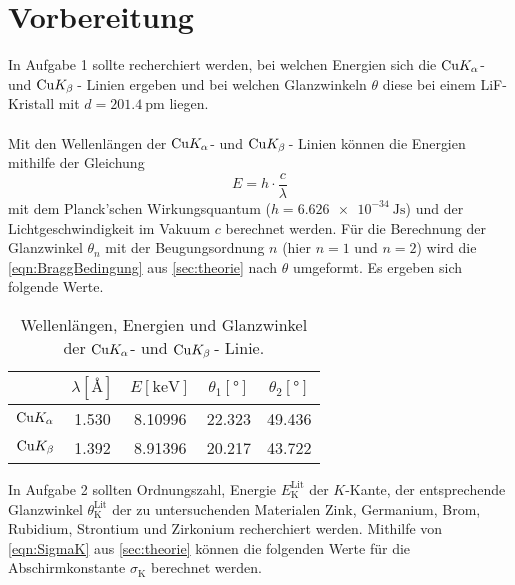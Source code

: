 \section{Vorbereitung}
\label{sec:vorbereitung}

    In Aufgabe 1 sollte recherchiert werden,
    bei welchen Energien sich die $\ce{Cu} K_\alpha$- und $\ce{Cu} K_\beta \,$- Linien ergeben
    und bei welchen Glanzwinkeln $\theta$ diese bei einem LiF-Kristall mit $d = \SI{201.4}{\pico\meter}$ liegen.\\
    \\
    Mit den Wellenlängen der $\ce{Cu} K_\alpha$- und $\ce{Cu} K_\beta \,$- Linien können die Energien mithilfe der Gleichung
    \begin{equation}
        \label{eqn:lambda_to_E}
        E = h \cdot \frac{c}{\lambda}
    \end{equation}
    mit dem Planck'schen Wirkungsquantum ($h = \SI{6.626e-34}{\joule\second}$) und der Lichtgeschwindigkeit im Vakuum $c$ berechnet werden.
    Für die Berechnung der Glanzwinkel $\theta_n$
    mit der Beugungsordnung $n$ (hier $n=1$ und $n=2$)
    wird die \autoref{eqn:BraggBedingung} aus \autoref{sec:theorie} nach $\theta$ umgeformt.
    Es ergeben sich folgende Werte.

    \begin{table}
        \centering
        \caption{Wellenlängen, Energien und Glanzwinkel der $\ce{Cu} K_\alpha$- und $\ce{Cu} K_\beta \,$- Linie.}
        \label{tab:Vorbereitung1}
        \begin{tabular}{c S[table-format=1.3] S[table-format=1.5] S[table-format=2.3] S[table-format=2.3]}
            \toprule
            &
            {$\lambda [\si{\angstrom}]$} &
            {$E [\si{\kilo\electronvolt}]$} &
            {$\theta_1 [\si{\degree}]$} &
            {$\theta_2 [\si{\degree}]$} \\
            \midrule
            $\ce{Cu} K_\alpha$ & 1.530 & 8.10996 & 22.323 & 49.436 \\
            $\ce{Cu} K_\beta$  & 1.392 & 8.91396 & 20.217 & 43.722 \\
            \bottomrule
        \end{tabular}
    \end{table}


    In Aufgabe 2 sollten Ordnungszahl,
    Energie $E^\text{Lit}_\text{K}$ der $K$-Kante,
    der entsprechende Glanzwinkel $\theta^\text{Lit}_\text{K}$ der zu untersuchenden Materialen
    Zink, Germanium, Brom, Rubidium, Strontium und Zirkonium recherchiert werden.
    Mithilfe von \autoref{eqn:SigmaK} aus \autoref{sec:theorie} können die folgenden Werte für die Abschirmkonstante $\sigma_\text{K}$ berechnet werden.

